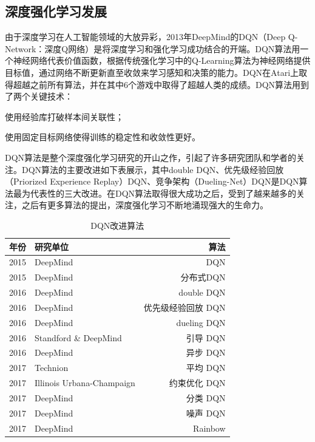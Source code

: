 \subsection{深度强化学习发展}
由于深度学习在人工智能领域的大放异彩，2013年DeepMind的DQN\cite{Mnih2013Playing}（Deep Q-Network：深度Q网络）是将深度学习和强化学习成功结合的开端。DQN算法用一个神经网络代表价值函数，根据传统强化学习中的Q-Learning算法为神经网络提供目标值，通过网络不断更新直至收敛来学习感知和决策的能力。DQN在Atari上取得超越之前所有算法，并在其中6个游戏中取得了超越人类的成绩。DQN算法用到了两个关键技术：
\begin{enumerate*}
  \item 使用经验库打破样本间关联性；
  \item 使用固定目标网络使得训练的稳定性和收敛性更好。
\end{enumerate*}

DQN算法是整个深度强化学习研究的开山之作，引起了许多研究团队和学者的关注。DQN算法的主要改进如下表展示，其中double DQN\cite{van2016deep}、优先级经验回放（Priorized Experience Replay）DQN\cite{schaul2015prioritized}、竞争架构（Dueling-Net）DQN\cite{wang2015dueling}是DQN算法最为代表性的三大改进。在DQN算法取得很大成功之后，受到了越来越多的关注，之后有更多算法的提出，深度强化学习不断地涌现强大的生命力。
\begin{table}
  \centering
  \caption{DQN改进算法\cite{唐振韬2017深度强化学习进展}}
  \begin{tabular}{@{}llr@{}} \toprule
    年份 & 研究单位 & 算法 \\ \hline
    2015 & DeepMind & DQN \\ \hline
    2015 & DeepMind & 分布式DQN\cite{nair2015massively} \\ \hline
    2016 & DeepMind & double DQN\cite{van2016deep} \\ \hline
    2016 & DeepMind & 优先级经验回放 DQN\cite{schaul2015prioritized} \\ \hline
    2016 & DeepMind & dueling DQN\cite{wang2015dueling} \\ \hline
    2016 & Standford \& DeepMind & 引导 DQN\cite{osband2016deep} \\ \hline
    2016 & DeepMind & 异步 DQN\cite{mnih2016asynchronous} \\ \hline
    2017 & Technion & 平均 DQN \\ \hline
    2017 & Illinois Urbana-Champaign & 约束优化 DQN \\ \hline
    2017 & DeepMind & 分类 DQN \\ \hline
    2017 & DeepMind & 噪声 DQN \\ \hline
    2017 & DeepMind & Rainbow \\ \hline
  \end{tabular}
\end{table}
